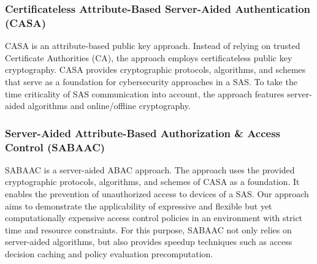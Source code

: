 \subsubsection*{Certificateless Attribute-Based Server-Aided Authentication (CASA)}
CASA is an attribute-based public key approach.
Instead of relying on trusted Certificate Authorities (CA), the approach employs certificateless public key cryptography.
CASA provides cryptographic protocols, algorithms, and schemes that serve as a foundation for cybersecurity approaches in a SAS.
To take the time criticality of SAS communication into account, the approach features server-aided algorithms and online/offline cryptography.

\subsubsection*{Server-Aided Attribute-Based Authorization \& Access Control (SABAAC)}
SABAAC is a server-aided ABAC approach.
The approach uses the provided cryptographic protocols, algorithms, and schemes of CASA as a foundation.
It enables the prevention of unauthorized access to devices of a SAS.
Our approach aims to demonstrate the applicability of expressive and flexible but yet computationally expensive access control policies in an environment with strict time and resource constraints.
For this purpose, SABAAC not only relies on server-aided algorithms, but also provides speedup techniques such as access decision caching and policy evaluation precomputation.
